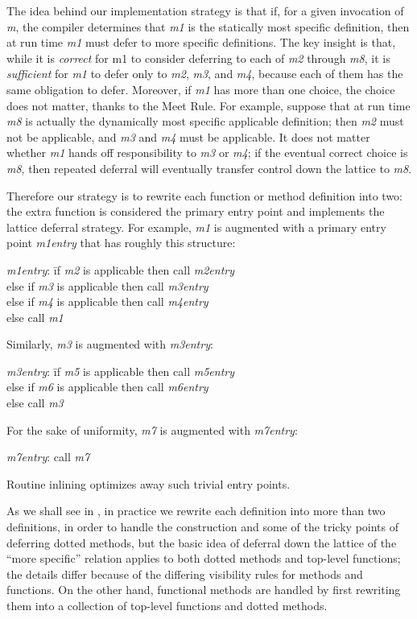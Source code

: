The idea behind our implementation strategy is that if, for a given invocation of \emph{m},
the compiler determines that \emph{m1} is the statically most specific definition,
then at run time \emph{m1} must defer to more specific definitions.  The key insight is that,
while it is \emph{correct} for m1 to consider deferring to each of \emph{m2} through \emph{m8},
it is \emph{sufficient} for \emph{m1} to defer only to \emph{m2}, \emph{m3}, and \emph{m4}, because each of them
has the same obligation to defer.  Moreover, if \emph{m1} has more than one choice,
the choice does not matter, thanks to the Meet Rule.  For example, suppose that
at run time \emph{m8} is actually the dynamically most specific applicable definition;
then \emph{m2} must not be applicable, and \emph{m3} and \emph{m4} must be applicable.  It does not matter
whether \emph{m1} hands off responsibility to \emph{m3} or \emph{m4}; if the eventual correct choice is \emph{m8},
then repeated deferral will eventually transfer control down the lattice to \emph{m8}.

Therefore our strategy is to rewrite each function or method definition into two:
the extra function is considered the primary entry point and implements the lattice deferral strategy.
For example, \emph{m1} is augmented with a primary entry point \emph{m1entry} that has roughly this structure:
\begin{tabbing}
\emph{m1entry}: \= if \emph{m2} is applicable then call \emph{m2entry} \\
\>else if \emph{m3} is applicable then call \emph{m3entry} \\
\>else if \emph{m4} is applicable then call \emph{m4entry} \\
\>else call \emph{m1}
\end{tabbing}
Similarly, \emph{m3} is augmented with \emph{m3entry}:
\begin{tabbing}
\emph{m3entry}: \= if \emph{m5} is applicable then call \emph{m5entry} \\
\>else if \emph{m6} is applicable then call \emph{m6entry} \\
\>else call \emph{m3}
\end{tabbing}
For the sake of uniformity, \emph{m7} is augmented with \emph{m7entry}:
\begin{tabbing}
\emph{m7entry}: call \emph{m7}
\end{tabbing}
Routine inlining optimizes away such trivial entry points.

As we shall see in ,
in practice we rewrite each definition into more than two definitions,
in order to handle the  construction and some of the tricky points of
deferring dotted methods, but the basic idea of deferral down the lattice
of the ``more specific'' relation applies to both dotted methods
and top-level functions; the details differ because of the differing visibility
rules for methods and functions.
On the other hand, functional methods are handled by first rewriting them
into a collection of top-level functions and dotted methods.

